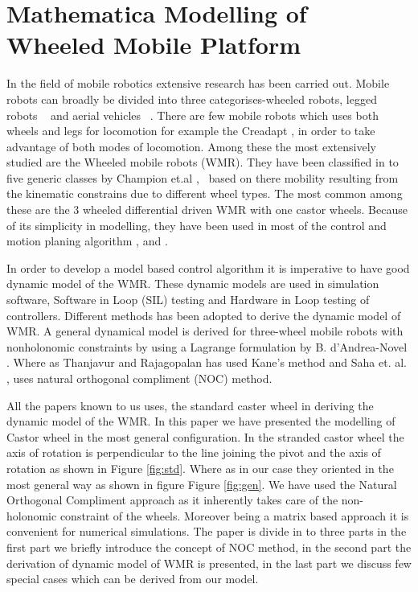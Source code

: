 \chapter{Mathematica Modelling of Wheeled Mobile Platform }
\label{c4_SenCal}
In the field of mobile robotics extensive research has been carried out. Mobile robots can broadly be divided into three categorises-wheeled robots, legged robots ~\cite{machado2006overview} and aerial vehicles ~\cite{valavanis2014handbook}. There are few mobile robots which uses both wheels and legs for locomotion for example the Creadapt  \cite{mouret2015evolutionary}, in order to take advantage of both modes of locomotion. Among these the most extensively studied are the  Wheeled mobile robots (WMR). They have been classified in to five generic classes by Champion et.al \cite{campion1996structural},~\cite{campion2008wheeled}  based on there mobility resulting from the kinematic constrains due to  different wheel types. The most common among these are the  3 wheeled differential driven WMR with one castor wheels. Because of its simplicity in modelling, they have been used in most of the  control and motion planing algorithm  \cite{desantis1995modeling}, \cite{koh1999smooth} and \cite{d1995control}. 

In order to develop a model based control algorithm it is imperative to have good dynamic model of the WMR. These dynamic models are used in  simulation software,  Software in Loop (SIL) testing and Hardware in Loop testing of controllers.   Different methods has been adopted to derive the dynamic model of WMR. A general dynamical model is derived for three-wheel mobile robots with nonholonomic constraints by using a Lagrange formulation by B. d'Andrea-Novel \cite{d1991modelling}.  Where as Thanjavur and Rajagopalan \cite{thanjavur1997ease} has used Kane's method  and  Saha et. al. \cite{saha1991dynamics},\cite{saha1989kinematics} uses natural orthogonal compliment (NOC) method.  
 
All the papers known to us uses, the standard caster wheel in deriving the dynamic model of the WMR. In this paper we have presented the modelling of Castor wheel in the most general configuration. In the stranded castor wheel the axis of rotation is perpendicular to the line joining the pivot and the axis of rotation as shown in Figure \ref{fig:std}. Where as in our case they oriented in  the most general way as shown in figure Figure \ref{fig:gen}. We have used the Natural Orthogonal Compliment approach as it inherently takes care of the non-holonomic constraint of the wheels. Moreover being a matrix based approach it is convenient for numerical simulations. The paper is divide in to three parts in the first part we briefly introduce the concept of NOC method, in the second part the derivation of dynamic model of WMR is presented, in the last part we discuss few special cases which can be derived from our model.
